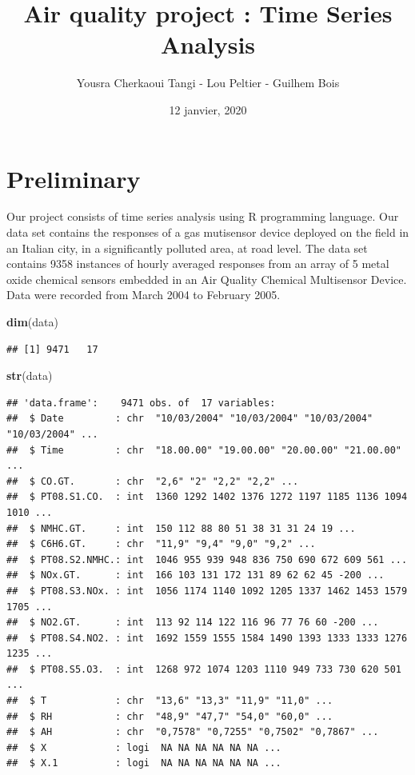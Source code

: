 \documentclass[]{article}
\title{Air quality project : Time Series Analysis}
\author{Yousra Cherkaoui Tangi - Lou Peltier - Guilhem Bois}
\date{12 janvier, 2020}
\newenvironment{Shaded}{\begin{snugshade}}{\end{snugshade}}
\newcommand{\KeywordTok}[1]{\textcolor[rgb]{0.13,0.29,0.53}{\textbf{#1}}}
\newcommand{\NormalTok}[1]{#1}
\begin{document}
\maketitle

\tableofcontents
\newpage
\section{Preliminary }

Our project consists of time series analysis using R programming
language. Our data set contains the responses of a gas mutisensor device
deployed on the field in an Italian city, in a significantly polluted
area, at road level. The data set contains 9358 instances of hourly
averaged responses from an array of 5 metal oxide chemical sensors
embedded in an Air Quality Chemical Multisensor Device. Data were
recorded from March 2004 to February 2005.

\begin{Shaded}
\begin{Highlighting}[]
\KeywordTok{dim}\NormalTok{(data)}
\end{Highlighting}
\end{Shaded}

\begin{verbatim}
## [1] 9471   17
\end{verbatim}

\begin{Shaded}
\begin{Highlighting}[]
\KeywordTok{str}\NormalTok{(data)}
\end{Highlighting}
\end{Shaded}

\begin{verbatim}
## 'data.frame':    9471 obs. of  17 variables:
##  $ Date         : chr  "10/03/2004" "10/03/2004" "10/03/2004" "10/03/2004" ...
##  $ Time         : chr  "18.00.00" "19.00.00" "20.00.00" "21.00.00" ...
##  $ CO.GT.       : chr  "2,6" "2" "2,2" "2,2" ...
##  $ PT08.S1.CO.  : int  1360 1292 1402 1376 1272 1197 1185 1136 1094 1010 ...
##  $ NMHC.GT.     : int  150 112 88 80 51 38 31 31 24 19 ...
##  $ C6H6.GT.     : chr  "11,9" "9,4" "9,0" "9,2" ...
##  $ PT08.S2.NMHC.: int  1046 955 939 948 836 750 690 672 609 561 ...
##  $ NOx.GT.      : int  166 103 131 172 131 89 62 62 45 -200 ...
##  $ PT08.S3.NOx. : int  1056 1174 1140 1092 1205 1337 1462 1453 1579 1705 ...
##  $ NO2.GT.      : int  113 92 114 122 116 96 77 76 60 -200 ...
##  $ PT08.S4.NO2. : int  1692 1559 1555 1584 1490 1393 1333 1333 1276 1235 ...
##  $ PT08.S5.O3.  : int  1268 972 1074 1203 1110 949 733 730 620 501 ...
##  $ T            : chr  "13,6" "13,3" "11,9" "11,0" ...
##  $ RH           : chr  "48,9" "47,7" "54,0" "60,0" ...
##  $ AH           : chr  "0,7578" "0,7255" "0,7502" "0,7867" ...
##  $ X            : logi  NA NA NA NA NA NA ...
##  $ X.1          : logi  NA NA NA NA NA NA ...
\end{verbatim}
\end{document}
